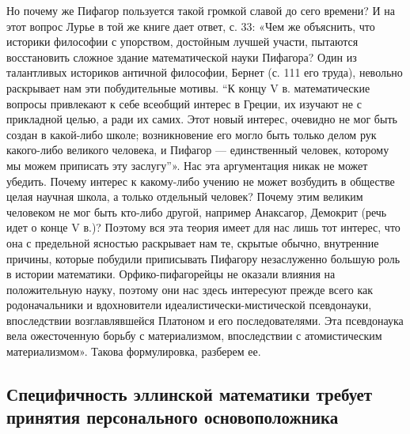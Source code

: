 Но почему же Пифагор пользуется  такой громкой славой до сего времени?
И на  этот вопрос  Лурье в  той же книге  дает ответ,  с. 33:  «Чем же
объяснить,  что  историки  философии  с  упорством,  достойным  лучшей
участи,  пытаются  восстановить  сложное здание  математической  науки
Пифагора? Один из талантливых историков античной философии, Бернет (с.
111 его труда), невольно раскрывает  нам эти побудительные мотивы. ``К
концу V в. математические вопросы привлекают к себе всеобщий интерес в
Греции, их изучают не с прикладной  целью, а ради их самих. Этот новый
интерес, очевидно не мог быть создан в какой-либо школе; возникновение
его  могло быть  только  делом рук  какого-либо  великого человека,  и
Пифагор  --- единственный  человек,  которому мы  можем приписать  эту
заслугу''».  Нас  эта  аргументация  никак не  может  убедить.  Почему
интерес  к какому-либо  учению  не может  возбудить  в обществе  целая
научная  школа,  а  только  отдельный  человек?  Почему  этим  великим
человеком не  мог быть  кто-либо другой, например  Анаксагор, Демокрит
(речь идет о  конце V в.)? Поэтому  вся эта теория имеет  для нас лишь
тот интерес, что она с  предельной ясностью раскрывает нам те, скрытые
обычно,  внутренние  причины,  которые побудили  приписывать  Пифагору
незаслуженно  большую роль  в  истории математики.  Орфико-пифагорейцы
не   оказали  влияния   на  положительную   науку,  поэтому   они  нас
здесь  интересуют  прежде  всего  как  родоначальники  и  вдохновители
идеалистически-мистической  псевдонауки, впоследствии  возглавлявшейся
Платоном  и его  последователями.  Эта  псевдонаука вела  ожесточенную
борьбу с материализмом,  впоследствии с атомистическим материализмом».
Такова формулировка, разберем ее.

\subsection{Специфичность   эллинской   математики  требует   принятия
персонального основоположника}

